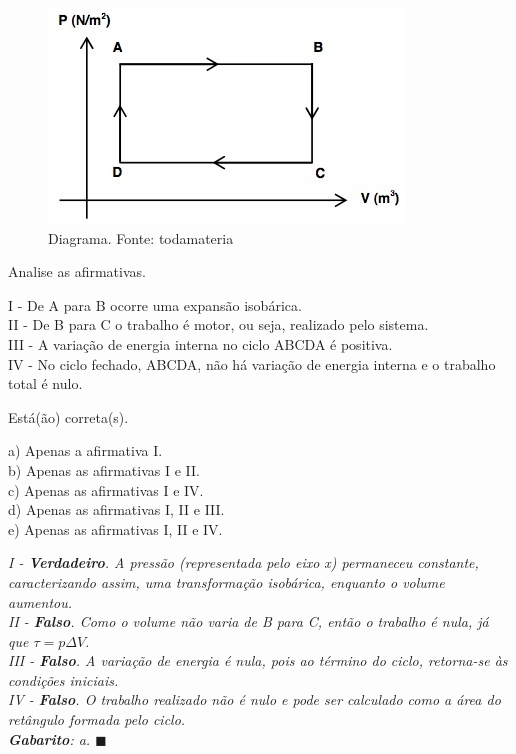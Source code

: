 \documentclass[12pt]{article}
\newenvironment{resposta*}
{\bf Resposta:\\ }
{}
\begin{document}
\begin{figure}[h]{}
\centering\includegraphics[width=2.5truein]{img16.jpg}
\caption{Diagrama. Fonte: todamateria}
\centering
\end{figure}

Analise as afirmativas.


I - De A para B ocorre uma expansão isobárica. \\
II -  De B para C o trabalho é motor, ou seja, realizado pelo sistema. \\
III - A variação de energia interna no ciclo ABCDA é positiva. \\
IV - No ciclo fechado, ABCDA, não há variação de energia interna e o trabalho total é nulo.


Está(ão) correta(s).


a) Apenas a afirmativa I. \\
b) Apenas as afirmativas I e II. \\
c) Apenas as afirmativas I e IV. \\
d) Apenas as afirmativas I, II e III. \\
e) Apenas as afirmativas I, II e IV.


\begin{resposta*}
{\it I - \textbf{Verdadeiro}. A pressão (representada pelo eixo x) permaneceu constante, caracterizando assim, uma transformação isobárica, enquanto o volume aumentou. \\
II - \textbf{Falso}. Como o volume não varia de B para C, então o trabalho é nula, já que $\tau = p\Delta V$. \\
III - \textbf{Falso}. A variação de energia é nula, pois ao término do ciclo, retorna-se às condições iniciais. \\
IV - \textbf{Falso}. O trabalho realizado não é nulo e pode ser calculado como a área do retângulo formada pelo ciclo. \\
\textbf{Gabarito}: a. $\blacksquare$}
\end{resposta*}
\end{document}
